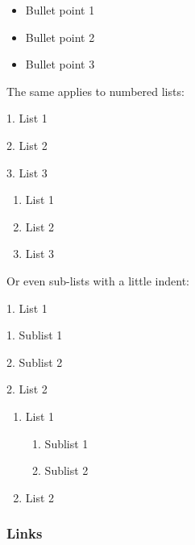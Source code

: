 \documentclass[
  letterpaper,
  DIV=11,
  numbers=noendperiod]{scrreprt}
\newenvironment{Shaded}{\begin{snugshade}}{\end{snugshade}}
\newcommand{\DecValTok}[1]{\textcolor[rgb]{0.68,0.00,0.00}{#1}}
\newcommand{\FloatTok}[1]{\textcolor[rgb]{0.68,0.00,0.00}{#1}}
\newcommand{\NormalTok}[1]{\textcolor[rgb]{0.00,0.23,0.31}{#1}}
\begin{document}
\begin{itemize}
\item
  Bullet point 1
\item
  Bullet point 2
\item
  Bullet point 3
\end{itemize}

The same applies to numbered lists:

\begin{Shaded}
\begin{Highlighting}[]
\FloatTok{1.}\NormalTok{ List }\DecValTok{1}

\FloatTok{2.}\NormalTok{ List }\DecValTok{2}

\FloatTok{3.}\NormalTok{ List }\DecValTok{3}
\end{Highlighting}
\end{Shaded}

\begin{enumerate}
\def\labelenumi{\arabic{enumi}.}
\item
  List 1
\item
  List 2
\item
  List 3
\end{enumerate}

Or even sub-lists with a little indent:

\begin{Shaded}
\begin{Highlighting}[]
\FloatTok{1.}\NormalTok{ List }\DecValTok{1}

    \FloatTok{1.}\NormalTok{ Sublist }\DecValTok{1}
    
    \FloatTok{2.}\NormalTok{ Sublist }\DecValTok{2}

\FloatTok{2.}\NormalTok{ List }\DecValTok{2}
\end{Highlighting}
\end{Shaded}

\begin{enumerate}
\def\labelenumi{\arabic{enumi}.}
\item
  List 1

  \begin{enumerate}
  \def\labelenumii{\arabic{enumii}.}
  \item
    Sublist 1
  \item
    Sublist 2
  \end{enumerate}
\item
  List 2
\end{enumerate}

\subsubsection{Links}\label{links}
\end{document}
